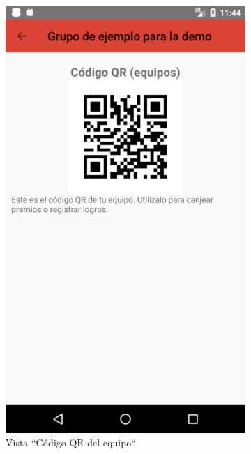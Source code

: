 \documentclass[twoside]{report}
\begin{document}
\begin{figure}[H]
\begin{center}
	\begin{subfigure}[t]{.3\linewidth}
		\includegraphics[scale=0.2]{images/userguide/19.png}
		\caption{Vista “Código QR del equipo“}
	\end{subfigure}\hspace{5mm}%
	\begin{subfigure}[t]{.3\linewidth}

\end{subfigure}
\end{center}
\end{figure}
\end{document}
